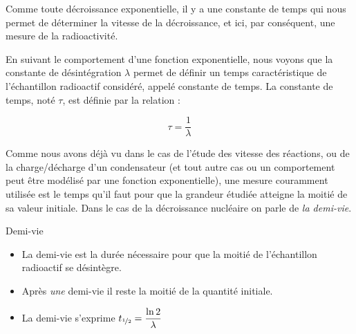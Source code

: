 \documentclass[11pt,a4paper]{article}
\begin{document}
Comme toute décroissance exponentielle, il y a une constante de temps qui nous permet de déterminer la vitesse de la décroissance, et ici, par conséquent, une mesure de la radioactivité. 

En suivant le comportement d'une fonction exponentielle, nous voyons que la constante de désintégration $\lambda$ permet de définir un temps caractéristique de l'échantillon radioactif considéré, appelé constante de temps. La constante de temps, noté $\tau$, est définie par la relation :

\[ \tau = \dfrac{1}{\lambda}\]

Comme nous avons déjà vu dans le cas de l'étude des vitesse des réactions, ou de la charge/décharge d'un condensateur (et tout autre cas ou un comportement peut être modélisé par une fonction exponentielle), une mesure couramment utilisée est le temps qu'il faut pour que la grandeur étudiée atteigne la moitié de sa valeur initiale.  Dans le cas de la décroissance nucléaire on parle de \textit{la demi-vie}.

\begin{defn}{Demi-vie }
\begin{itemize}
    \item La demi-vie est la durée nécessaire pour que la moitié de l'échantillon radioactif se désintègre.
    \item Après \textit{une} demi-vie il reste la moitié de la quantité initiale. 
    \item La demi-vie s'exprime $t_{\nicefrac{1}{2}} = \dfrac{\ln{2}}{\lambda}$
\end{itemize}
\end{defn}
\end{document}
